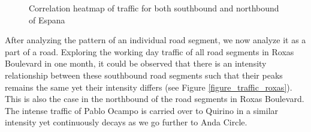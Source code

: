 \begin{figure}[h] 
\centering
    \centering
      \captionsetup{justification=centering}
    \hfill
    \caption{Correlation heatmap of traffic for both southbound and northbound of Espana}

    \label{figure_traffic_espana_corr}
\end{figure}


After analyzing the pattern of an individual road segment, we now analyze it as a part of a road. Exploring the working day traffic of all road segments in Roxas Boulevard in one month, it could be observed that there is an intensity relationship between these southbound road segments such that their peaks remains the same yet their intensity differs (see Figure \ref{figure_traffic_roxas}). This is also the case in the northbound of the road segments in Roxas Boulevard. The intense traffic of Pablo Ocampo is carried over to Quirino in a similar intensity yet continuously decays as we go further to Anda Circle.



